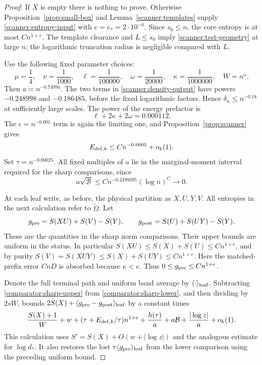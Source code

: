 \begin{proof}
If \(X\) is empty there is nothing to prove.  Otherwise
Proposition~\ref{prop:small-box} and
Lemma~\ref{scanner:templates} supply
\eqref{scanner:entropy-input} with \(e=e_*=2\cdot10^{-6}\).
Since \(s_0\le n\), the core entropy is at most \(Cn^{1+e}\).
The template clearance and \(L\le s_0\) imply
\eqref{scanner:test-geometry} at large \(n\); the logarithmic
truncation radius is negligible compared with \(L\).

Use the following fixed parameter choices:
\begin{equation}
 \mu=\frac14,\quad \nu=\frac1{1000},\quad
 \ell=\frac1{100000},\quad
 \omega=\frac1{20000},\quad
 \kappa=\frac1{1000000},\quad W=n^\omega.
 \label{scanner:final-parameters}
\end{equation}
Then \(a\asymp n^{-0.74994}\).  The two terms in
\eqref{scanner:density-output} have powers
\(-0.248998\) and \(-0.186485\), before the fixed logarithmic
factors.  Hence \(\delta_n\le n^{-0.18}\) at sufficiently large
scales.  The power of the energy prefactor is
\[
 \ell+2\kappa+2\omega=0.000112.
\]
The \(\epsilon=n^{-0.001}\) term is again the limiting one, and
Proposition~\ref{prop:scanner} gives
\begin{equation}
 E_{{\rm def},k}\le Cn^{-0.0005}+o_k(1).
 \label{scanner:final-energy}
\end{equation}
Set \(\tau=n^{-0.00025}\).  All fixed multiples of \(a\) lie in
the marginal-moment interval required for the sharp comparisons,
since
\[
 a\sqrt{\mathcal B}
 \le C n^{-0.2499395}(\log n)^C\longrightarrow0.
\]

At each leaf write, as before, the physical partition as \(X,U,Y,V\).
All entropies in the next calculation refer to \(\widetilde\Omega\).
Let
\[
 g_{\rm pre}=S(XU)+S(V)-S(Y),\qquad
 g_{\rm post}=S(U)+S(UY)-S(Y).
\]
These are the quantities in the sharp norm comparisons.  Their upper
bounds are uniform in the status.  In particular
\(S(XU)\le S(X)+S(U)\le Cn^{1+e}\), and by purity
\(S(V)=S(XUY)\le S(X)+S(UY)\le Cn^{1+e}\).
Here the matched-prefix error \(CnD\) is absorbed because
\(\kappa<e\).  Thus \(0\le g_{\rm pre}\le Cn^{1+e}\).

Denote the full terminal path and uniform band average by
\(\langle\cdot\rangle_{\rm leaf}\).  Subtracting
\eqref{comparator:sharp-upper} from
\eqref{comparator:sharp-lower}, and then dividing by \(2sW\), bounds
\(2S(X)+\langle g_{\rm pre}-g_{\rm post}\rangle_{\rm leaf}\)
by a constant times
\begin{equation}
 \frac{S(X)+1}{W}+w
 +(\tau+E_{{\rm def},k}/\tau)n^{1+e}
 +\frac{h(\tau)}a+a\mathcal B
 +\frac{|\log z|}a+o_k(1).
 \label{scanner:final-errors}
\end{equation}
This calculation uses \(S'=S(X)+O(w+|\log z|)\) and the analogous
estimate for \(\log d_*\).  It also restores the lost
\(\tau\langle g_{\rm pre}\rangle_{\rm leaf}\) from the lower
comparison using the preceding uniform bound.


\end{proof}
